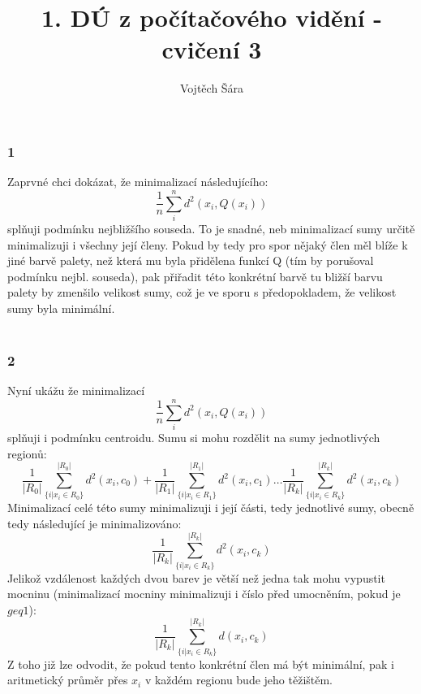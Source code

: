 \documentclass{article}
\title{1. DÚ z počítačového vidění - cvičení 3}
\author{Vojtěch Šára}
\begin{document}
\maketitle
\subsubsection*{1}

Zaprvné chci dokázat, že minimalizací následujícího:
$$\frac{1}{n}\sum_{i}^{n}d^{2}(x_{i},Q(x_{i}))$$
splňuji podmínku nejbližšího souseda. To je snadné, neb minimalizací sumy určitě minimalizuji i všechny její členy. Pokud by tedy pro spor nějaký člen
měl blíže k jiné barvě palety, než která mu byla přidělena funkcí Q (tím by porušoval podmínku nejbl. souseda), pak přiřadit této konkrétní barvě tu bližší 
barvu palety by zmenšilo velikost sumy, což je ve sporu s předopokladem, že velikost sumy byla minimální.\\\\

\subsubsection*{2}
Nyní ukážu že minimalizací
$$\frac{1}{n}\sum_{i}^{n}d^{2}(x_{i},Q(x_{i}))$$
splňuji i podmínku centroidu. Sumu si mohu rozdělit na sumy jednotlivých regionů:
$$\frac{1}{|R_{0}|}\sum_{\{i | x_{i} \in R_{0}\}}^{|R_{0}|}d^{2}(x_{i},c_{0}) +
\frac{1}{|R_{1}|}\sum_{\{i | x_{i} \in R_{1}\}}^{|R_{1}|}d^{2}(x_{i},c_{1}) \dots
\frac{1}{|R_{k}|}\sum_{\{i | x_{i} \in R_{k}\}}^{|R_{k}|}d^{2}(x_{i},c_{k})
$$
Minimalizací celé této sumy minimalizuji i její části, tedy jednotlivé sumy, obecně tedy následující je minimalizováno:
$$\frac{1}{|R_{k}|}\sum_{\{i | x_{i} \in R_{k}\}}^{|R_{k}|}d^{2}(x_{i},c_{k})$$
Jelikož vzdálenost každých dvou barev je větší než jedna tak mohu vypustit mocninu (minimalizací mocniny minimalizuji i číslo před umocněním, pokud je $geq 1$):
$$\frac{1}{|R_{k}|}\sum_{\{i | x_{i} \in R_{k}\}}^{|R_{k}|}d(x_{i},c_{k})$$
Z toho již lze odvodit, že pokud tento konkrétní člen má být minimální, pak i aritmetický průměr přes $x_{i}$ v každém regionu bude jeho těžištěm.
\end{document}
